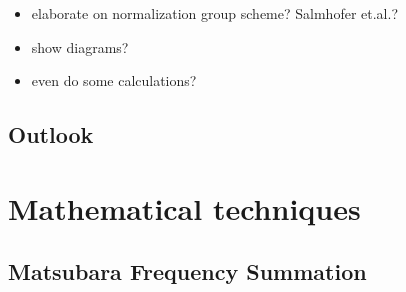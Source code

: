 \documentclass[a4paper,10pt]{report}
\begin{document}
\begin{itemize}
\item elaborate on normalization group scheme? Salmhofer et.al.\cite{RevModPhys.84.299}?
\item show diagrams?
\item even do some calculations?
\end{itemize}





\section{Outlook}
























\appendix

\chapter{Mathematical techniques}

\section{Matsubara Frequency Summation} \label{MFS}
\end{document}
